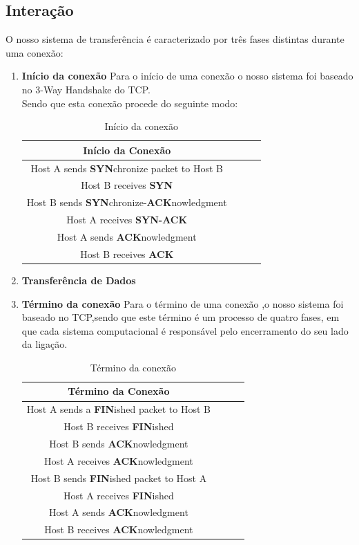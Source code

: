 \documentclass{article}
\begin{document}
\subsection{Interação}

O nosso sistema de transferência é caracterizado por três fases distintas durante uma conexão:
\begin{enumerate}
\item \textbf{Início da conexão}
Para o início de uma conexão o nosso sistema foi baseado no 3-Way Handshake do TCP.\\
Sendo que esta conexão procede do seguinte modo:

\begin{table}[h!]
\centering
\begin{tabular}{||c c c c||} 
\hline
\textbf{Início da Conexão} \\ [0.5ex] 
\hline\hline
Host A sends \textbf{SYN}chronize packet to Host B \\ 
Host B receives  \textbf{SYN}  \\
Host B sends  \textbf{SYN}chronize-\textbf{ACK}nowledgment\\
Host A receives  \textbf{SYN-ACK}\\
Host A sends \textbf{ACK}nowledgment \\
Host B receives \textbf{ACK}\\ 
\hline
\end{tabular}
\caption{Início da conexão}
\label{table:1}
\end{table}


\item \textbf{Transferência de Dados}




\item \textbf{Término da conexão}
Para o término de uma conexão ,o nosso sistema foi baseado no TCP,sendo que este término
é um processo de quatro fases, em que cada sistema computacional é responsável pelo encerramento do seu 
lado da ligação.\\

\begin{table}[h!]
\centering
\begin{tabular}{||c c c c||} 
\hline
\textbf{Término da Conexão} \\ [0.5ex] 
\hline\hline
Host A sends a \textbf{FIN}ished packet to Host B \\ 
Host B receives  \textbf{FIN}ished  \\
Host B sends  \textbf{ACK}nowledgment\\
Host A receives \textbf{ACK}nowledgment\\
Host B sends \textbf{FIN}ished packet to Host A \\
Host A receives \textbf{FIN}ished\\
Host A sends  \textbf{ACK}nowledgment\\
Host B receives \textbf{ACK}nowledgment  \\
\hline
\end{tabular}
\caption{Término da conexão}
\label{table:2}
\end{table}
\end{enumerate}
\end{document}
